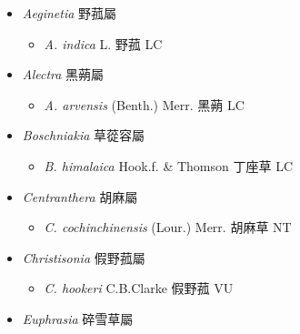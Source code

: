 
  \begin{itemize}
 \item[] \textit{Aeginetia} 野菰屬
                                
  \begin{itemize}
        \item[] \textit{A. indica} L.  野菰   LC
  \end{itemize}
 \item[] \textit{Alectra} 黑蒴屬
                                
  \begin{itemize}
        \item[] \textit{A. arvensis} (Benth.) Merr.  黑蒴   LC
  \end{itemize}
 \item[] \textit{Boschniakia} 草蓯容屬
                                
  \begin{itemize}
        \item[] \textit{B. himalaica} Hook.f. \& Thomson  丁座草   LC
  \end{itemize}
 \item[] \textit{Centranthera} 胡麻屬
                                
  \begin{itemize}
        \item[] \textit{C. cochinchinensis} (Lour.) Merr.  胡麻草   NT
  \end{itemize}
 \item[] \textit{Christisonia} 假野菰屬
                                
  \begin{itemize}
        \item[] \textit{C. hookeri} C.B.Clarke  假野菰   VU
  \end{itemize}
 \item[] \textit{Euphrasia} 碎雪草屬
                                

\end{itemize}
